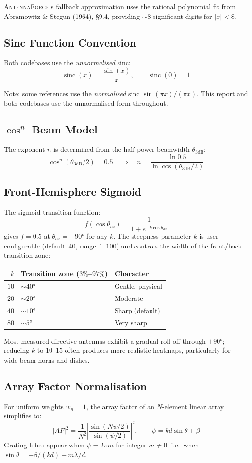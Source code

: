 \documentclass[11pt,a4paper]{article}
\newcommand{\AF}{\textsc{AntennaForge}}
\newcommand{\sinc}{\operatorname{sinc}}
\begin{document}
\AF{}'s fallback approximation uses the rational polynomial fit from
Abramowitz \& Stegun (1964), \S9.4, providing $\sim$8 significant digits
for $|x| < 8$.

\subsection{Sinc Function Convention}

Both codebases use the \emph{unnormalised} sinc:
\[
  \sinc(x) = \frac{\sin(x)}{x}, \qquad \sinc(0) = 1
\]

Note: some references use the \emph{normalised} sinc $\sin(\pi x)/(\pi x)$.
This report and both codebases use the unnormalised form throughout.

\subsection{$\cos^n$ Beam Model}

The exponent $n$ is determined from the half-power beamwidth $\theta_{3\text{dB}}$:
\[
  \cos^n(\theta_{3\text{dB}}/2) = 0.5
  \quad\Longrightarrow\quad
  n = \frac{\ln 0.5}{\ln \cos(\theta_{3\text{dB}}/2)}
\]

\subsection{Front-Hemisphere Sigmoid}

The sigmoid transition function:
\[
  f(\cos\theta_{az}) = \frac{1}{1 + e^{-k\cos\theta_{az}}}
\]
gives $f = 0.5$ at $\theta_{az} = \pm 90°$ for any $k$.  The steepness
parameter $k$ is user-configurable (default~$40$, range~$1$--$100$) and
controls the width of the front/back transition zone:
\begin{center}
\begin{tabular}{rll}
  $k$ & Transition zone ($3\%$--$97\%$) & Character \\
  \hline
  $10$ & $\sim 40°$ & Gentle, physical \\
  $20$ & $\sim 20°$ & Moderate \\
  $40$ & $\sim 10°$ & Sharp (default) \\
  $80$ & $\sim 5°$  & Very sharp \\
\end{tabular}
\end{center}
Most measured directive antennas exhibit a gradual roll-off through
$\pm 90°$; reducing $k$ to $10$--$15$ often produces more realistic
heatmaps, particularly for wide-beam horns and dishes.

\subsection{Array Factor Normalisation}

For uniform weights $w_n = 1$, the array factor of an $N$-element linear array
simplifies to:
\[
  |AF|^2 = \frac{1}{N^2}
    \left|\frac{\sin(N\psi/2)}{\sin(\psi/2)}\right|^2,
  \qquad
  \psi = kd\sin\theta + \beta
\]
Grating lobes appear when $\psi = 2\pi m$ for integer $m \neq 0$, i.e.\
when $\sin\theta = -\beta/(kd) + m\lambda/d$.
\end{document}

